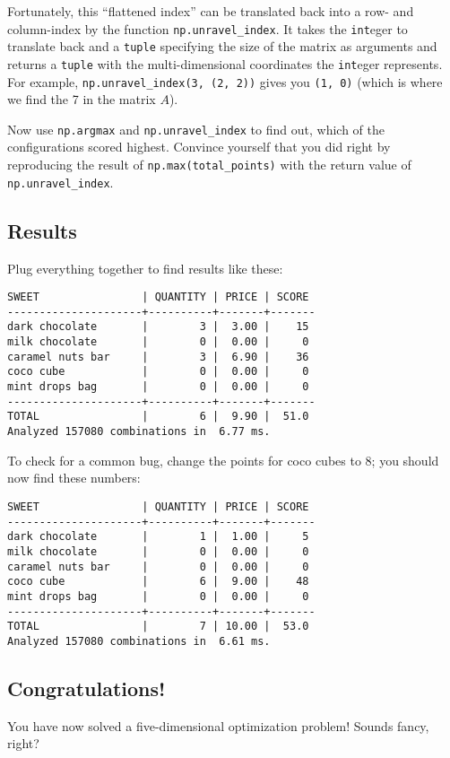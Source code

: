 \documentclass[
	english,
	fontsize=10pt,
	parskip=half,
	titlepage=true,
	DIV=12
]{scrartcl}
\newcommand*{\inPy}[1]{\texttt{#1}}
\begin{document}
Fortunately, this \enquote{flattened index} can be translated back into a row- and column-index by the function \texttt{np.unravel\_index}. It takes the \inPy{int}eger to translate back and a \inPy{tuple} specifying the size of the matrix as arguments and returns a \inPy{tuple} with the multi-dimensional coordinates the \inPy{int}eger represents. For example, \inPy{np.unravel_index(3, (2, 2))} gives you \inPy{(1, 0)} (which is where we find the 7 in the matrix $A$).

Now use \texttt{np.argmax} and \texttt{np.unravel\_index} to find out, which of the configurations scored highest. Convince yourself that you did right by reproducing the result of \texttt{np.max(total\_points)} with the return value of \texttt{np.unravel\_index}.

\subsection*{Results}
Plug everything together to find results like these:
\begin{verbatim}
SWEET                | QUANTITY | PRICE | SCORE
---------------------+----------+-------+-------
dark chocolate       |        3 |  3.00 |    15
milk chocolate       |        0 |  0.00 |     0
caramel nuts bar     |        3 |  6.90 |    36
coco cube            |        0 |  0.00 |     0
mint drops bag       |        0 |  0.00 |     0
---------------------+----------+-------+-------
TOTAL                |        6 |  9.90 |  51.0
Analyzed 157080 combinations in  6.77 ms.
\end{verbatim}

To check for a common bug, change the points for coco cubes to 8; you should now find these numbers:
\begin{verbatim}
SWEET                | QUANTITY | PRICE | SCORE
---------------------+----------+-------+-------
dark chocolate       |        1 |  1.00 |     5
milk chocolate       |        0 |  0.00 |     0
caramel nuts bar     |        0 |  0.00 |     0
coco cube            |        6 |  9.00 |    48
mint drops bag       |        0 |  0.00 |     0
---------------------+----------+-------+-------
TOTAL                |        7 | 10.00 |  53.0
Analyzed 157080 combinations in  6.61 ms.
\end{verbatim}


\subsection*{Congratulations!}
You have now solved a five-dimensional optimization problem! Sounds fancy, right?
\end{document}

